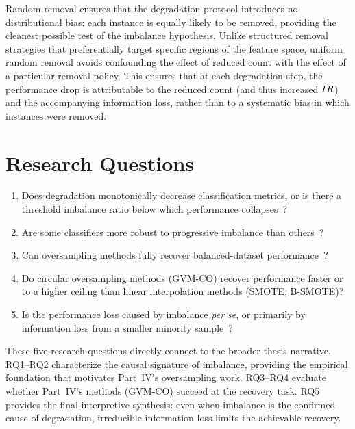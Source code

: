 Random removal ensures that the degradation protocol introduces no distributional bias: each instance is equally likely to be removed, providing the cleanest possible test of the imbalance hypothesis.
Unlike structured removal strategies that preferentially target specific regions of the feature space, uniform random removal avoids confounding the effect of reduced count with the effect of a particular removal policy.
This ensures that at each degradation step, the performance drop is attributable to the reduced count (and thus increased $IR$) and the accompanying information loss, rather than to a systematic bias in which instances were removed.


\section{Research Questions}
\label{sec:causal:rqs}

\begin{enumerate}[label=\textbf{RQ\arabic*.}, leftmargin=*, itemsep=4pt]
  \item Does degradation monotonically decrease classification metrics, or is there a threshold imbalance ratio below which performance collapses~\cite{japkowicz2002class, weiss2003effect}?
  \item Are some classifiers more robust to progressive imbalance than others~\cite{ling2004exploration, galar2012review}?
  \item Can oversampling methods fully recover balanced-dataset performance~\cite{chawla2002smote, douzas2018improving}?
  \item Do circular oversampling methods (GVM-CO) recover performance faster or to a higher ceiling than linear interpolation methods (SMOTE, B-SMOTE)?
  \item Is the performance loss caused by imbalance \emph{per se}, or primarily by information loss from a smaller minority sample~\cite{weiss2003effect}?
\end{enumerate}

These five research questions directly connect to the broader thesis narrative.
RQ1--RQ2 characterize the causal signature of imbalance, providing the empirical foundation that motivates Part~IV's oversampling work.
RQ3--RQ4 evaluate whether Part~IV's methods (GVM-CO) succeed at the recovery task.
RQ5 provides the final interpretive synthesis: even when imbalance is the confirmed cause of degradation, irreducible information loss limits the achievable recovery.



